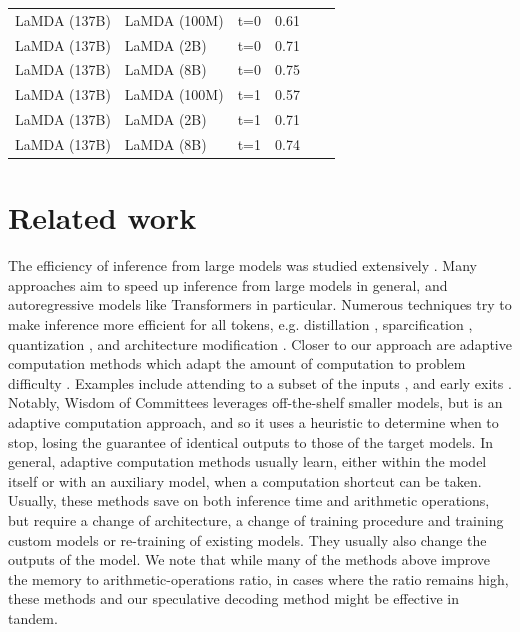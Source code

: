 \documentclass[nohyperref]{article}
\theoremstyle{plain}
\theoremstyle{definition}
\theoremstyle{remark}
\begin{document}
\begin{table}[ht]
\begin{center}
\begin{small}
\begin{sc}
\begin{tabular}{lllccr}
    LaMDA (137B)    & LaMDA (100M) & t=0 & 0.61\\
    LaMDA (137B)    & LaMDA (2B)   & t=0 & 0.71\\
    LaMDA (137B)    & LaMDA (8B)   & t=0 & 0.75\\
    LaMDA (137B)    & LaMDA (100M) & t=1 & 0.57\\
    LaMDA (137B)    & LaMDA (2B)   & t=1 & 0.71\\
    LaMDA (137B)    & LaMDA (8B)   & t=1 & 0.74\\
\bottomrule
\end{tabular}
\end{sc}
\end{small}
\end{center}
\vskip -0.1in
\end{table}

\section{Related work}
The efficiency of inference from large models was studied extensively \citep{The_Efficiency_Misnomer}. Many approaches aim to speed up inference from large models in general, and autoregressive models like Transformers in particular. Numerous techniques try to make inference more efficient for all tokens, e.g. distillation \citep{Distilling_the_Knowledge_in_a_Neural_Network}, sparcification \citep{Sparse_is_Enough_in_Scaling_Transformers}, quantization \citep{Quantized_Neural_Networks}, and architecture modification \citep{Primer, multi-query-attn}. Closer to our approach are adaptive computation methods which adapt the amount of computation to problem difficulty \citep{Dynamic_Neural_Networks_Survey}. Examples include attending to a subset of the inputs \citep{Adaptive_Attention_Span_in_Transformers}, and early exits \citep{Confident_Adaptive_Transformers, early_exits, Controlling_Computation_versus_Quality_Sequence_Models, depth_adaptive_transformer, Matching_Model_and_Instance_Complexities}.
Notably, Wisdom of Committees \citep{Matching_Model_and_Instance_Complexities} leverages off-the-shelf smaller models, but is an adaptive computation approach, and so it uses a heuristic to determine when to stop, losing the guarantee of identical outputs to those of the target models.
In general, adaptive computation methods usually learn, either within the model itself or with an auxiliary model, when a computation shortcut can be taken.
Usually, these methods save on both inference time and arithmetic operations, but require a change of architecture, a change of training procedure and training custom models or re-training of existing models. They usually also change the outputs of the model.
We note that while many of the methods above improve the memory to arithmetic-operations ratio, in cases where the ratio remains high, these methods and our speculative decoding method might be effective in tandem.
\end{document}

